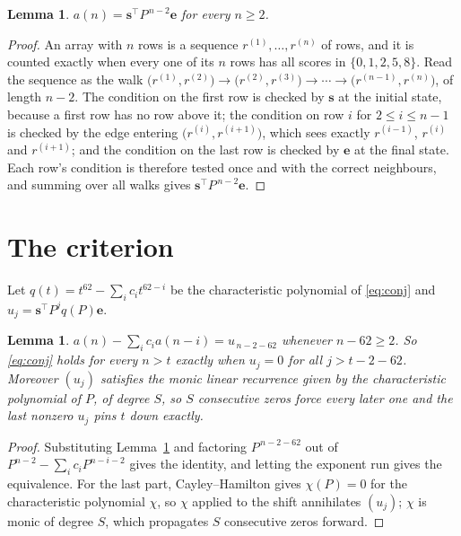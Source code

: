 \documentclass[11pt,a4paper]{article}
\theoremstyle{plain}
\newtheorem{lemma}[theorem]{Lemma}
\theoremstyle{definition}
\begin{document}
\begin{lemma}\label{lem:walk}
$a(n)=\mathbf{s}^{\!\top}P^{\,n-2}\mathbf{e}$ for every $n\ge2$.
\end{lemma}

\begin{proof}
An array with $n$ rows is a sequence $r^{(1)},\dots,r^{(n)}$ of rows, and it is counted
exactly when every one of its $n$ rows has all scores in $\{0,1,2,5,8\}$. Read the sequence as the
walk $\bigl(r^{(1)},r^{(2)}\bigr)\to\bigl(r^{(2)},r^{(3)}\bigr)\to\cdots\to
\bigl(r^{(n-1)},r^{(n)}\bigr)$, of length $n-2$. The condition on the first row is
checked by $\mathbf{s}$ at the initial state, because a first row has no row above it; the
condition on row $i$ for $2\le i\le n-1$ is checked by the edge entering
$\bigl(r^{(i)},r^{(i+1)}\bigr)$, which sees exactly $r^{(i-1)}$, $r^{(i)}$ and
$r^{(i+1)}$; and the condition on the last row is checked by $\mathbf{e}$ at the final
state. Each row's condition is therefore tested once and with the correct neighbours, and
summing over all walks gives $\mathbf{s}^{\!\top}P^{\,n-2}\mathbf{e}$.
\end{proof}

\section{The criterion}

Let $q(t)=t^{62}-\sum_i c_i t^{62-i}$ be the characteristic polynomial of
\eqref{eq:conj} and $u_j=\mathbf{s}^{\!\top}P^{j}q(P)\mathbf{e}$.

\begin{lemma}\label{lem:crit}
$a(n)-\sum_i c_i a(n-i)=u_{\,n-2-62}$ whenever $n-62\ge2$. So \eqref{eq:conj}
holds for every $n>t$ exactly when $u_j=0$ for all $j>t-2-62$. Moreover $(u_j)$
satisfies the monic linear recurrence given by the characteristic polynomial of $P$, of
degree $S$, so $S$ consecutive zeros force every later one and the last nonzero $u_j$ pins
$t$ down exactly.
\end{lemma}

\begin{proof}
Substituting Lemma~\ref{lem:walk} and factoring $P^{\,n-2-62}$ out of
$P^{n-2}-\sum_i c_i P^{n-i-2}$ gives the identity, and letting the exponent run gives the
equivalence. For the last part, Cayley--Hamilton gives $\chi(P)=0$ for the characteristic
polynomial $\chi$, so $\chi$ applied to the shift annihilates $(u_j)$; $\chi$ is monic of
degree $S$, which propagates $S$ consecutive zeros forward.
\end{proof}
\end{document}
